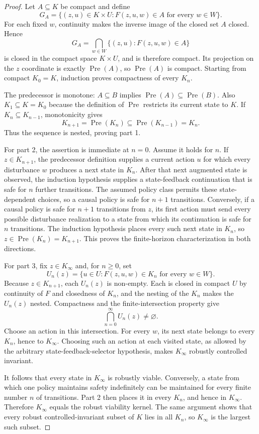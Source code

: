 \documentclass[11pt]{article}
\theoremstyle{definition}
\newcommand{\Pre}{\operatorname{Pre}}
\begin{document}
\begin{proof}
Let $A\subseteq K$ be compact and define
\[
G_A=\{(z,u)\in K\times U:F(z,u,w)\in A\text{ for every }w\in W\}.
\]
For each fixed $w$, continuity makes the inverse image of the closed set $A$ closed. Hence
\[
G_A=\bigcap_{w\in W}\{(z,u):F(z,u,w)\in A\}
\]
is closed in the compact space $K\times U$, and is therefore compact. Its projection on the $z$ coordinate is exactly $\Pre(A)$, so $\Pre(A)$ is compact. Starting from compact $K_0=K$, induction proves compactness of every $K_n$.

The predecessor is monotone: $A\subseteq B$ implies $\Pre(A)\subseteq\Pre(B)$. Also $K_1\subseteq K=K_0$ because the definition of $\Pre$ restricts its current state to $K$. If $K_n\subseteq K_{n-1}$, monotonicity gives
\[
K_{n+1}=\Pre(K_n)\subseteq\Pre(K_{n-1})=K_n.
\]
Thus the sequence is nested, proving part 1.

For part 2, the assertion is immediate at $n=0$. Assume it holds for $n$. If $z\in K_{n+1}$, the predecessor definition supplies a current action $u$ for which every disturbance $w$ produces a next state in $K_n$. After that next augmented state is observed, the induction hypothesis supplies a state-feedback continuation that is safe for $n$ further transitions. The assumed policy class permits these state-dependent choices, so a causal policy is safe for $n+1$ transitions. Conversely, if a causal policy is safe for $n+1$ transitions from $z$, its first action must send every possible disturbance realization to a state from which its continuation is safe for $n$ transitions. The induction hypothesis places every such next state in $K_n$, so $z\in\Pre(K_n)=K_{n+1}$. This proves the finite-horizon characterization in both directions.

For part 3, fix $z\in K_\infty$ and, for $n\ge0$, set
\[
U_n(z)=\{u\in U:F(z,u,w)\in K_n\text{ for every }w\in W\}.
\]
Because $z\in K_{n+1}$, each $U_n(z)$ is non-empty. Each is closed in compact $U$ by continuity of $F$ and closedness of $K_n$, and the nesting of the $K_n$ makes the $U_n(z)$ nested. Compactness and the finite-intersection property give
\[
\bigcap_{n=0}^{\infty}U_n(z)\ne\varnothing.
\]
Choose an action in this intersection. For every $w$, its next state belongs to every $K_n$, hence to $K_\infty$. Choosing such an action at each visited state, as allowed by the arbitrary state-feedback-selector hypothesis, makes $K_\infty$ robustly controlled invariant.

It follows that every state in $K_\infty$ is robustly viable. Conversely, a state from which one policy maintains safety indefinitely can be maintained for every finite number $n$ of transitions. Part 2 then places it in every $K_n$, and hence in $K_\infty$. Therefore $K_\infty$ equals the robust viability kernel. The same argument shows that every robust controlled-invariant subset of $K$ lies in all $K_n$, so $K_\infty$ is the largest such subset.
\end{proof}
\end{document}
